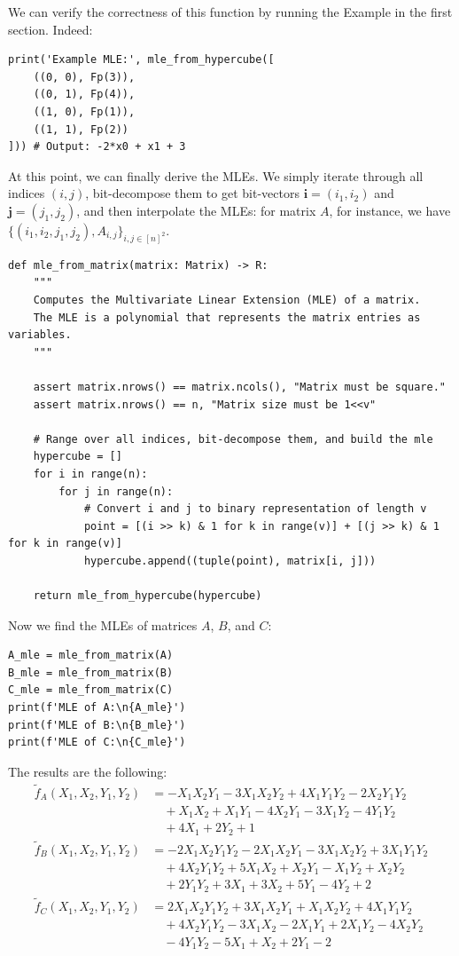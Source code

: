 \documentclass{gkr-template}
\begin{document}
We can verify the correctness of this function by running the Example in the
first section. Indeed:
\begin{verbatim}
print('Example MLE:', mle_from_hypercube([
    ((0, 0), Fp(3)),
    ((0, 1), Fp(4)),
    ((1, 0), Fp(1)),
    ((1, 1), Fp(2))
])) # Output: -2*x0 + x1 + 3
\end{verbatim}

At this point, we can finally derive the MLEs. We simply iterate through all
indices $(i,j)$, bit-decompose them to get bit-vectors
$\boldsymbol{i}=(i_1,i_2)$ and $\boldsymbol{j}=(j_1,j_2)$, and then interpolate
the MLEs: for matrix $A$, for instance, we have $\{(i_1,i_2,j_1,j_2),
A_{i,j}\}_{i,j \in [n]^2}$.
\begin{verbatim}
def mle_from_matrix(matrix: Matrix) -> R:
    """
    Computes the Multivariate Linear Extension (MLE) of a matrix.
    The MLE is a polynomial that represents the matrix entries as variables.
    """
    
    assert matrix.nrows() == matrix.ncols(), "Matrix must be square."
    assert matrix.nrows() == n, "Matrix size must be 1<<v"

    # Range over all indices, bit-decompose them, and build the mle
    hypercube = []
    for i in range(n):
        for j in range(n):
            # Convert i and j to binary representation of length v
            point = [(i >> k) & 1 for k in range(v)] + [(j >> k) & 1 for k in range(v)]
            hypercube.append((tuple(point), matrix[i, j]))

    return mle_from_hypercube(hypercube)
\end{verbatim}

Now we find the MLEs of matrices $A$, $B$, and $C$:
\begin{verbatim}
A_mle = mle_from_matrix(A)
B_mle = mle_from_matrix(B)
C_mle = mle_from_matrix(C)
print(f'MLE of A:\n{A_mle}')
print(f'MLE of B:\n{B_mle}')
print(f'MLE of C:\n{C_mle}')
\end{verbatim}

The results are the following:
\begin{align*}
\widetilde{f}_A(X_1,X_2,Y_1,Y_2) &= -X_1X_2Y_1 - 3X_1X_2Y_2 + 4X_1Y_1Y_2 - 2X_2Y_1Y_2 \\
& \quad + X_1X_2 + X_1Y_1 - 4X_2Y_1 - 3X_1Y_2 - 4Y_1Y_2 \\
& \quad + 4X_1 + 2Y_2 + 1 \\
\widetilde{f}_B(X_1,X_2,Y_1,Y_2) &= -2X_1X_2Y_1Y_2 - 2X_1X_2Y_1 - 3X_1X_2Y_2 + 3X_1Y_1Y_2 \\
& \quad + 4X_2Y_1Y_2 + 5X_1X_2 + X_2Y_1 - X_1Y_2 + X_2Y_2 \\
& \quad + 2Y_1Y_2 + 3X_1 + 3X_2 + 5Y_1 - 4Y_2 + 2 \\
\widetilde{f}_C(X_1,X_2,Y_1,Y_2) &= 2X_1X_2Y_1Y_2 + 3X_1X_2Y_1 + X_1X_2Y_2 + 4X_1Y_1Y_2 \\
& \quad + 4X_2Y_1Y_2 - 3X_1X_2 - 2X_1Y_1 + 2X_1Y_2 - 4X_2Y_2 \\
& \quad - 4Y_1Y_2 - 5X_1 + X_2 + 2Y_1 - 2
\end{align*}
\end{document}
